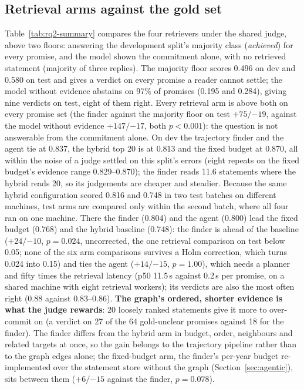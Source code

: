 \documentclass[11pt]{article}
\begin{document}
\subsection{Retrieval arms against the gold set}
\label{sec:rq2-gold}
\label{sec:rq2-test}
Table~\ref{tab:rq2-summary} compares the four retrievers under the shared judge, above two floors: answering the development split's majority class (\emph{achieved}) for every promise, and the model shown the commitment alone, with no retrieved statement (majority of three replies). The majority floor scores 0.496 on dev and 0.580 on test and gives a verdict on every promise a reader cannot settle; the model without evidence abstains on 97\% of promises (0.195 and 0.284), giving nine verdicts on test, eight of them right. Every retrieval arm is above both on every promise set (the finder against the majority floor on test $+75 / {-19}$, against the model without evidence $+147 / {-17}$, both $p < 0.001$): the question is not answerable from the commitment alone. On dev the trajectory finder and the agent tie at 0.837, the hybrid top 20 is at 0.813 and the fixed budget at 0.870, all within the noise of a judge settled on this split's errors (eight repeats on the fixed budget's evidence range 0.829--0.870); the finder reads 11.6 statements where the hybrid reads 20, so its judgements are cheaper and steadier. Because the same hybrid configuration scored 0.816 and 0.748 in two test batches on different machines, test arms are compared only within the second batch, where all four ran on one machine. There the finder (0.804) and the agent (0.800) lead the fixed budget (0.768) and the hybrid baseline (0.748): the finder is ahead of the baseline ($+24 / {-10}$, $p = 0.024$, uncorrected, the one retrieval comparison on test below 0.05; none of the six arm comparisons survives a Holm correction, which turns 0.024 into 0.15) and ties the agent ($+14 / {-15}$, $p = 1.00$), which needs a planner and fifty times the retrieval latency (p50 11.5\,s against 0.2\,s per promise, on a shared machine with eight retrieval workers); its verdicts are also the most often right (0.88 against 0.83--0.86). \textbf{The graph's ordered, shorter evidence is what the judge rewards}: 20 loosely ranked statements give it more to over-commit on (a verdict on 27 of the 64 gold-unclear promises against 18 for the finder). The finder differs from the hybrid arm in budget, order, neighbours and related targets at once, so the gain belongs to the trajectory pipeline rather than to the graph edges alone; the fixed-budget arm, the finder's per-year budget re-implemented over the statement store without the graph (Section~\ref{sec:agentic}), sits between them ($+6 / {-15}$ against the finder, $p = 0.078$).
\end{document}
